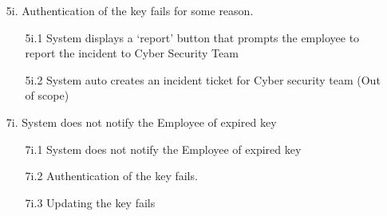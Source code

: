 \documentclass[]{article}
\begin{document}
\begin{enumerate}[{\bf BE1.}]
\begin{enumerate}[{\bf BE9.}]
\begin{enumerate}
                    \item[5i.] Authentication of the key fails for some reason.
                    \begin{enumerate}
                        \item[5i.1] System displays a ‘report’ button that prompts the employee to report the incident to Cyber Security Team
                        \item[5i.2] System auto creates an incident ticket for Cyber security team (Out of scope) 
                    \end{enumerate}
		    \item[7i.]  System does not notify the Employee of expired key
                    \begin{enumerate}
                        \item[7i.1] System does not notify the Employee of expired key
                        \item[7i.2] Authentication of the key fails.
			\item[7i.3] Updating the key fails
                    \end{enumerate}
                \end{enumerate}
\end{enumerate}

\end{enumerate}
\end{document}
